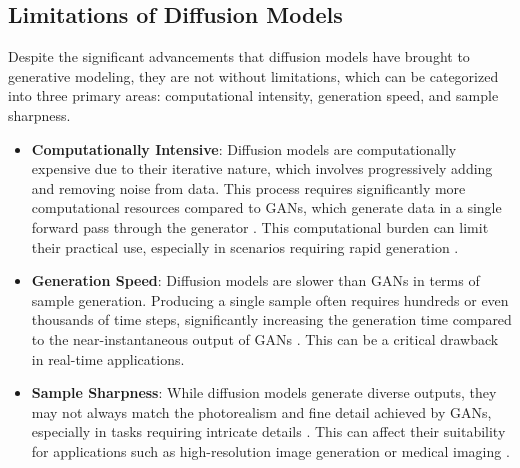 \subsection{Limitations of Diffusion Models}

Despite the significant advancements that diffusion models have brought to generative modeling, they are not without limitations, which can be categorized into three primary areas: computational intensity, generation speed, and sample sharpness.

\begin{itemize}
    \item \textbf{Computationally Intensive}: Diffusion models are computationally expensive due to their iterative nature, which involves progressively adding and removing noise from data. This process requires significantly more computational resources compared to GANs, which generate data in a single forward pass through the generator \citep{10.1109/msp.2017.2765202}\citep{10.1145/3422622}. This computational burden can limit their practical use, especially in scenarios requiring rapid generation \citep{10.48550/arxiv.2211.07804}.
    
    \item \textbf{Generation Speed}: Diffusion models are slower than GANs in terms of sample generation. Producing a single sample often requires hundreds or even thousands of time steps, significantly increasing the generation time compared to the near-instantaneous output of GANs \citep{10.48550/arxiv.2011.13456}\citep{10.48550/arxiv.2010.02502}. This can be a critical drawback in real-time applications.
    
    \item \textbf{Sample Sharpness}: While diffusion models generate diverse outputs, they may not always match the photorealism and fine detail achieved by GANs, especially in tasks requiring intricate details \citep{10.48550/arxiv.2105.05233}\citep{10.1109/cvpr52688.2022.01117}. This can affect their suitability for applications such as high-resolution image generation or medical imaging \citep{10.48550/arxiv.2211.07804}.
\end{itemize}



